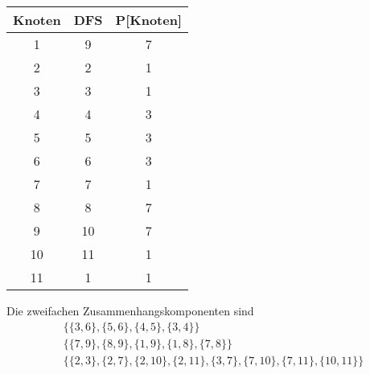 \documentclass[10pt,a4paper]{article}
\begin{document}
\begin{tabular}{c|c|c}
  Knoten & DFS & P[Knoten]\\
  \hline
  1 & 9 & 7\\
  2 & 2 & 1\\
  3 & 3 & 1\\
  4 & 4 & 3\\
  5 & 5 & 3\\
  6 & 6 & 3\\
  7 & 7 & 1\\
  8 & 8 & 7\\
  9 & 10 & 7\\
  10 & 11 & 1\\
  11 & 1 & 1
\end{tabular}

Die zweifachen Zusammenhangskomponenten sind
\begin{align*}
  & \{ \{ 3, 6 \}, \{ 5, 6 \}, \{ 4, 5 \}, \{ 3, 4 \} \}\\
  & \{ \{ 7, 9 \}, \{ 8, 9 \}, \{ 1, 9 \}, \{ 1, 8 \}, \{ 7, 8 \} \}\\
  & \{ \{ 2, 3 \}, \{ 2, 7 \}, \{ 2, 10 \}, \{ 2, 11 \}, \{ 3, 7 \}, \{ 7, 10 \}, \{ 7, 11 \}, \{ 10, 11 \} \}\\
\end{align*}
\end{document}
